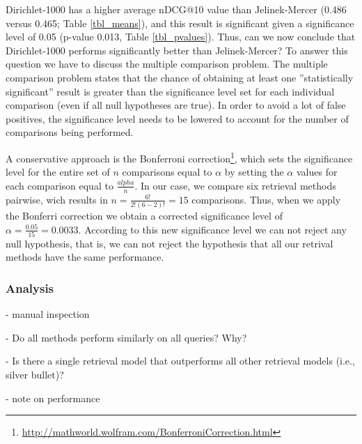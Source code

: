 Dirichlet-1000 has a higher average nDCG@10 value than Jelinek-Mercer 
(0.486 versus 0.465; Table \ref{tbl_means}), and this result is significant
given a significance level of 0.05 (p-value 0.013, Table \ref{tbl_pvalues}).
Thus, can we now conclude that Dirichlet-1000 performs significantly better than Jelinek-Mercer? To answer this question we have to discuss the multiple comparison problem.
The multiple comparison problem states that the chance of obtaining at least one ''statistically significant'' result is greater than the significance level set for each individual comparison (even if all null hypotheses are true).
In order to avoid a lot of false positives, the significance level needs to be lowered to account for the number of comparisons being performed.

A conservative approach is the Bonferroni 
correction\footnote{\url{http://mathworld.wolfram.com/BonferroniCorrection.html}}, 
which sets the significance level for the entire set of $n$ comparisons equal to $\alpha$ by setting the $\alpha$ values for each comparison equal to $\frac{alpha}{n}$.
In our case, we compare six retrieval methods pairwise, wich results in
$n = \frac{6!}{2!(6-2)!} = 15$ comparisons. Thus, when we apply the Bonferri
correction we obtain a corrected significance level of
 $\alpha = \frac{0.05}{15} = 0.0033$. According to this new significance level
 we can not reject any null hypothesis, that is, we can not reject the
 hypothesis that all our retrival methods have the same performance.


\subsubsection{Analysis}
\label{AnalysisLexicalModels}







- manual inspection



- Do all methods perform similarly on all queries? Why?

- Is there a single retrieval model that outperforms all other retrieval models (i.e., silver bullet)?

- note on performance